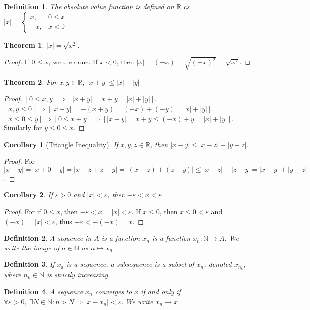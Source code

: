 \documentclass[crop=false,class=book]{standalone}
\theoremstyle{mystyle}
\newtheorem{theorem}{Theorem}[section]
\newtheorem{definition}{Definition}[section]
\newtheorem{corollary}{Corollary}[section]
\begin{document}
\begin{definition}
The absolute value function is defined on $\mathbb{R}$ as $|x| = \begin{cases} x, & 0 \leq x \\ -x, & x<0 \end{cases}$
\end{definition}
\begin{theorem}
$|x| = \sqrt{x^2}$.
\end{theorem}
\begin{proof}
If $0 \leq x$, we are done. If $x<0$, then $|x| = (-x) = \sqrt{(-x)^2} = \sqrt{x^2}$.
\end{proof}
\begin{theorem}
For $x,y \in \mathbb{R}$, $|x+y|\leq |x|+|y|$
\end{theorem}
\begin{proof}
$[0\leq x,y]\Rightarrow [|x+y| = x+y = |x|+|y|]$. $[x,y\leq 0]\Rightarrow [|x+y| = -(x+y) = (-x)+(-y)=|x|+|y|]$. $[x\leq 0 \leq y]\Rightarrow [0\leq x+y]\Rightarrow [|x+y| = x+y \leq (-x)+y=|x|+|y|]$. Similarly for $y\leq 0 \leq x$.
\end{proof}
\begin{corollary}[Triangle Inequality]
If $x,y,z\in \mathbb{R}$, then $|x-y| \leq |x-z|+|y-z|$.
\end{corollary}
\begin{proof}
For $|x-y| = |x+ 0 - y| = |x-z+z-y| = |(x-z)+(z-y)| \leq |x-z|+|z-y| = |x-y|+|y-z|$.
\end{proof}
\begin{corollary}
If $\varepsilon >0$ and $|x|<\varepsilon$, then $-\varepsilon < x < \varepsilon$.
\end{corollary}
\begin{proof}
For if $0\leq x$, then $-\varepsilon< x=|x|< \varepsilon$. If $x\leq 0$, then $x\leq 0<\varepsilon$ and $(-x)=|x|<\varepsilon$, thus $-\varepsilon < -(-x) = x$.
\end{proof}
\begin{definition}
A sequence in $A$ is a function $x_n$ is a function $x_n:\mathbb{N}\rightarrow A$. We write the image of $n\in \mathbb{N}$ as $n\mapsto x_n$.
\end{definition}
\begin{definition}
If $x_n$ is a sequence, a subsequence is a subset of $x_n$, denoted $x_{n_k}$, where $n_k\in \mathbb{N}$ is strictly increasing.
\end{definition}
\begin{definition}
A sequence $x_n$ converges to $x$ if and only if $\forall \varepsilon>0,\ \exists N\in \mathbb{N}: n>N\Rightarrow |x-x_n|<\varepsilon$. We write $x_n \rightarrow x$.
\end{definition}
\end{document}
